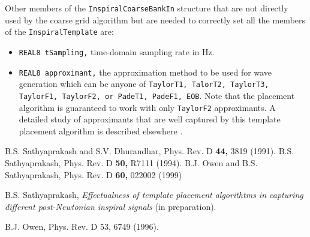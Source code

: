 Other members of the \texttt{InspiralCoarseBankIn} structure that
are not directly used by the coarse grid algorithm but are needed to
correctly set all the members of the \texttt{InspiralTemplate} are:

\begin{itemize}
\item \texttt {REAL8 tSampling,} time-domain sampling rate in Hz.
\item \texttt {REAL8 approximant,} the approximation method to be used
for wave generation which can be anyone of \texttt{TaylorT1, TalorT2,
TaylorT3, TaylorF1, TaylorF2, {\rm or} PadeT1, PadeF1, EOB}. Note that
the placement algorithm is guaranteed to work with only \texttt {TaylorF2}
approximants. A detailed study of approximants that are well captured by
this template placement algorithm is described elsewhere \cite{Sathyaprakash
2001a}.
\end{itemize}

\newpage

\begin{thebibliography}{}
 B.S. Sathyaprakash and 
S.V. Dhurandhar, Phys. Rev. D {\bf 44,} 3819 (1991).
 B.S. Sathyaprakash, Phys. Rev. D {\bf 50,} R7111
(1994).
 B.J. Owen and B.S. Sathyaprakash, 
Phys. Rev. D {\bf 60,} 022002 (1999)

 B.S. Sathyaprakash, {\it Effectualness of
template placement algorithtms in capturing different post-Newtonian
inspiral signals} (in preparation).

 B.J. Owen, Phys. Rev. D 53, 6749 (1996).
\end{thebibliography}
